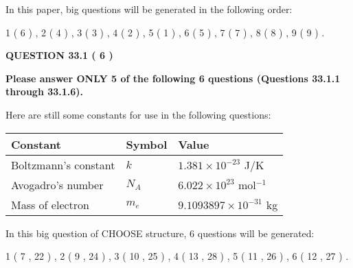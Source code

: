 \documentclass[12pt]{article}
\begin{document}
\vspace{0.3in}
 
 
   
   
   
\vspace{0.2in}
   
In this paper, big questions will be generated in the following order: 
   
   
             1 (           6 )
 ,
             2 (           4 )
 ,
             3 (           3 )
 ,
             4 (           2 )
 ,
             5 (           1 )
 ,
             6 (           5 )
 ,
             7 (           7 )
 ,
             8 (           8 )
 ,
             9 (           9 )
 .
  
\vspace{0.2in}
  
{\textbf{\Large{QUESTION
33.1 
 (           6 )
}}}
  
  
 
{\textbf{\Large{Please answer ONLY
5 of the following
6 questions (Questions
33.1.1 through
33.1.6). }}}
 
Here are still some constants for use in the following questions:
 
 
\noindent\begin{tabular}{|l|l|l|}
\hline
Constant & Symbol & Value \\
\hline
 
Boltzmann's constant &
$k$ &
 $ 1.381 \times 10^{-23} $
J/K \\
\hline
 
Avogadro's number &
$N_A$ &
 $ 6.022 \times 10^{23} $
mol$^{-1}$ \\
\hline
 
Mass of electron &
$m_e$ &
 $ 9.1093897 \times 10^{-31} $
kg \\
\hline
 
\end{tabular}
 
   
\vspace{0.2in}
   
 In this big question of CHOOSE structure,            6  questions will be generated: 
  
  
             1 (           7 ,          22 )
 ,
             2 (           9 ,          24 )
 ,
             3 (          10 ,          25 )
 ,
             4 (          13 ,          28 )
 ,
             5 (          11 ,          26 )
 ,
             6 (          12 ,          27 )
 .
  
\vspace{0.2in}
  
\end{document}
